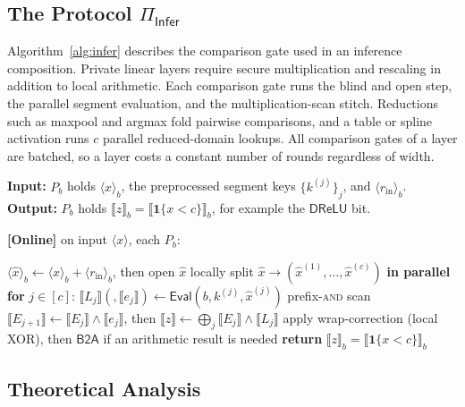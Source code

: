 \documentclass[journal]{IEEEtran}
\theoremstyle{definition}
\theoremstyle{plain}
\newcommand{\ashare}[1]{\langle #1 \rangle}             %
\newcommand{\bshare}[1]{\llbracket #1 \rrbracket}        %
\newcommand{\Eval}{\mathsf{Eval}}
\newcommand{\DReLU}{\mathsf{DReLU}}
\newcommand{\ind}[1]{\mathbf{1}\{#1\}}
\newcommand{\xhat}{\hat{x}}
\newcommand{\bigO}{\mathcal{O}}
\newcommand{\seg}[1]{^{\scriptscriptstyle(#1)}}   %
\newcommand{\nseg}{c}                              %
\begin{document}
\subsection{The Protocol \texorpdfstring{$\Pi_{\mathsf{Infer}}$}{Pi-Infer}}\label{sec:infer-proto}
Algorithm~\ref{alg:infer} describes the comparison gate used in an inference
composition. Private linear layers require secure multiplication and rescaling
in addition to local arithmetic. Each comparison gate runs the blind and open step, the parallel
segment evaluation, and the multiplication-scan stitch. Reductions such as maxpool
and argmax fold pairwise comparisons, and a table or spline activation runs
$\nseg$ parallel reduced-domain lookups. All comparison gates of a layer are
batched, so a layer costs a constant number of rounds regardless of width.

\begin{algorithm}[t]
\caption{One comparison gate ($\Pi_{\mathsf{Infer}}$)}
\label{alg:infer}
\textbf{Input:} $P_b$ holds $\ashare{x}_b$, the preprocessed segment keys $\{k\seg{j}\}_j$, and $\ashare{r_{\mathrm{in}}}_b$. \\
\textbf{Output:} $P_b$ holds $\bshare{z}_b=\bshare{\ind{x<c}}_b$, for example the $\DReLU$ bit.

\vspace{0.3em}
\textbf{[Online]} on input $\ashare{x}$, each $P_b$:
\begin{algorithmic}[1]
\State $\ashare{\xhat}_b\gets\ashare{x}_b+\ashare{r_{\mathrm{in}}}_b$, then open $\xhat$ 
\State locally split $\xhat\to(\xhat\seg{1},\dots,\xhat\seg{\nseg})$
\State \textbf{in parallel for} $j\in[\nseg]$: $\bshare{L_j}(,\bshare{e_j})\gets\Eval(b,k\seg{j},\xhat\seg{j})$ 
\State prefix-\textsc{and} scan $\bshare{E_{j+1}}\gets\bshare{E_j}\wedge\bshare{e_j}$, then $\bshare{z}\gets\bigoplus_j \bshare{E_j}\wedge\bshare{L_j}$ \Comment{$\bigO(\log\nseg)$ rounds}
\State apply wrap-correction (local XOR), then $\mathsf{B2A}$ if an arithmetic result is needed
\State \textbf{return} $\bshare{z}_b=\bshare{\ind{x<c}}_b$
\end{algorithmic}
\end{algorithm}

\subsection{Theoretical Analysis}
\end{document}
